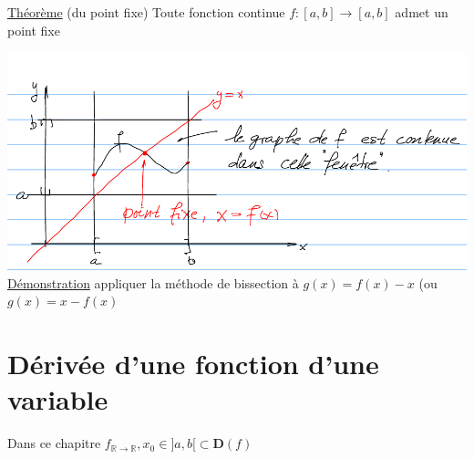 \documentclass[12pt,a4paper]{article}
\newcommand{\R}{\ensuremath{\mathbb{R}} }
\newcommand{\rtor}{\ensuremath{\R \to \R} }
\newcommand{\Theoreme}{\underline{Théorème} }
\begin{document}
{\begin{boite}
\Theoreme (du point fixe) Toute fonction continue $f:[a,b] \to [a,b]$ admet un point fixe
\end{boite}
\includegraphics[scale=0.5]{illustrations_Analyse/point_fixe}\\
\underline{Démonstration} appliquer la méthode de bissection à $g(x) = f(x) -x$ (ou $g(x) = x -f(x)$

\section{Dérivée d'une fonction d'une variable}
\setcounter{equation}{0}
Dans ce chapitre $f_ \rtor, x_0 \in ]a,b[ \subset \mathbf{D}(f)$\\
}
\end{document}

